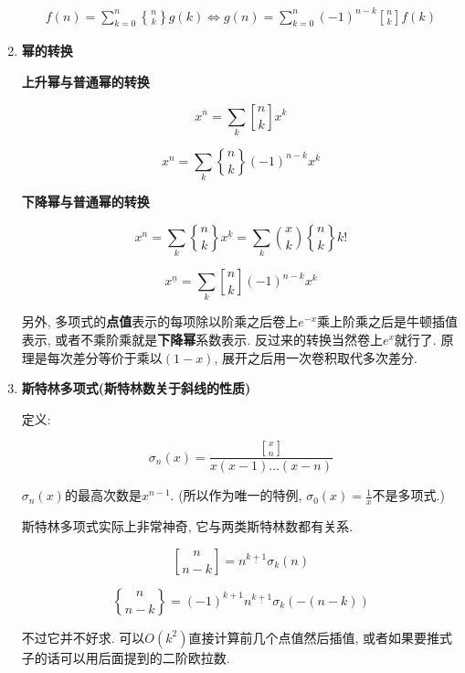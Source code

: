 \begin{enumerate}
$$ \begin{aligned} f(n) = \sum_{k = 0} ^ n {n \brace k} g(k) \iff g(n) = \sum_{k = 0} ^ n (-1) ^ {n - k} {n\brack k} f(k) \end{aligned} $$

\item \textbf{幂的转换}

\textbf{上升幂与普通幂的转换}

$$ x^{\overline{n}}=\sum_{k} {n \brack k} x^k $$

$$ x^n=\sum_{k} {n \brace k} (-1)^{n-k} x^{\overline{k}} $$

\textbf{下降幂与普通幂的转换}

$$ x^n=\sum_{k} {n \brace k} x^{\underline{k}} = \sum_{k} {x \choose k} {n \brace k} k! $$

$$ x^{\underline{n}}=\sum_{k} {n \brack k} (-1)^{n-k} x^k $$

另外, 多项式的\textbf{点值}表示的每项除以阶乘之后卷上$e^{-x}$乘上阶乘之后是牛顿插值表示, 或者不乘阶乘就是\textbf{下降幂}系数表示. 反过来的转换当然卷上$e^x$就行了. 原理是每次差分等价于乘以$(1 - x)$, 展开之后用一次卷积取代多次差分.

\item \textbf{斯特林多项式(斯特林数关于斜线的性质)}

定义:

$$ \sigma_n(x) = \frac {{x\brack n}} {x(x-1)\dots(x-n)} $$

$\sigma_n(x)$的最高次数是$x^{n - 1}$. (所以作为唯一的特例, $\sigma_0(x) = \frac 1 x$不是多项式.)

斯特林多项式实际上非常神奇, 它与两类斯特林数都有关系.

$$ {n \brack n-k} = n^{\underline{k+1}} \sigma_k(n) $$

$$ {n \brace n-k} = (-1)^{k+1} n^{\underline{k+1}} \sigma_k(-(n-k)) $$

不过它并不好求. 可以$O(k^2)$直接计算前几个点值然后插值, 或者如果要推式子的话可以用后面提到的二阶欧拉数.

\end{enumerate}